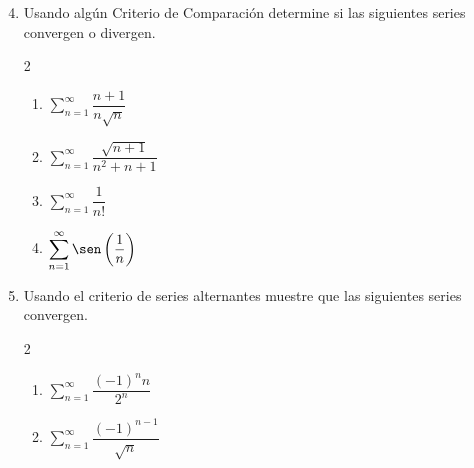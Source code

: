 \begin{frame}
  \begin{enumerate}
    \setcounter{enumi}{3}
    \item Usando algún Criterio de Comparación determine si las siguientes series convergen o divergen.
    \begin{multicols}{2}
      \begin{enumerate}
        \item $\displaystyle\sum_{n=1}^{\infty}\dfrac{n+1}{n\sqrt{n}}$
        \item $\displaystyle\sum_{n=1}^{\infty}\dfrac{\sqrt{n+1}}{n^2+n+1}$
        \item $\displaystyle\sum_{n=1}^{\infty}\dfrac{1}{n!}$
        \item $\displaystyle\sum_{n=1}^{\infty}\sen\left(\dfrac{1}{n}\right)$
      \end{enumerate}
    \end{multicols}
    \item Usando el criterio de series alternantes muestre que las siguientes series convergen.
    \begin{multicols}{2}
      \begin{enumerate}
        \item $\displaystyle\sum_{n=1}^{\infty}\dfrac{(-1)^{n}n}{2^n}$
        \item $\displaystyle\sum_{n=1}^{\infty}\dfrac{(-1)^{n-1}}{\sqrt{n}}$
      \end{enumerate}
    \end{multicols}
  \end{enumerate}
\end{frame}

